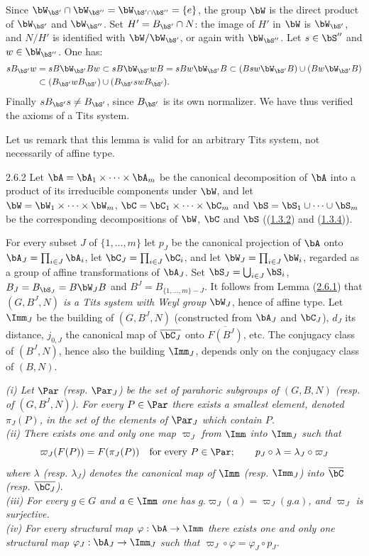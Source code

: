 \documentclass[12pt,a4paper,oneside,english]{smfart}
\makeatletter
\newcommand{\btanchor}[1]{\leavevmode\Hy@raisedlink{\hypertarget{bt:#1}{}}}
\newcommand{\btref}[1]{\hyperlink{bt:#1}{#1}}
\theoremstyle{definition}
\theoremstyle{bt}
\makeatother
\begin{document}
\medskip
Since $\bW_{\bS'}\cap\bW_{\bS''}=\bW_{\bS'\cap\bS''}=\{e\}$, the group $\bW$
is the direct product of $\bW_{\bS'}$ and $\bW_{\bS''}$. Set
$H'=B_{\bS'}\cap N$: the image of $H'$ in $\bW$ is $\bW_{\bS'}$, and $N/H'$ is
identified with $\bW/\bW_{\bS'}$, or again with $\bW_{\bS''}$. Let
$s\in\bS''$ and $w\in\bW_{\bS''}$. One has:
\begin{align*}
sB_{\bS'}w &= sB\bW_{\bS'}Bw \subset sB\bW_{\bS'}wB = sBw\bW_{\bS'}B
\subset (Bsw\bW_{\bS'}B)\cup(Bw\bW_{\bS'}B)\\
&\subset (B_{\bS'}wB_{\bS'})\cup(B_{\bS'}swB_{\bS'}).
\end{align*}
Finally $sB_{\bS'}s\neq B_{\bS'}$, since $B_{\bS'}$ is its own normalizer. We
have thus verified the axioms of a Tits system.

Let us remark that this lemma is valid for an arbitrary Tits system, not
necessarily of affine type.

\num{2.6.2}\btanchor{2.6.2}
Let $\bA=\bA_1\times\dots\times\bA_m$ be the canonical decomposition of $\bA$
into a product of its irreducible components under $\bW$, and let
$\bW=\bW_1\times\dots\times\bW_m$, $\bC=\bC_1\times\dots\times\bC_m$ and
$\bS=\bS_1\cup\dots\cup\bS_m$ be the corresponding decompositions of $\bW$,
$\bC$ and $\bS$ ((\btref{1.3.2}) and (\btref{1.3.4})).

For every subset $J$ of $\{1,\dots,m\}$ let $p_J$ be the canonical projection
of $\bA$ onto $\bA_J=\prod_{i\in J}\bA_i$, let $\bC_J=\prod_{i\in J}\bC_i$,
and let $\bW_J=\prod_{i\in J}\bW_i$, regarded as a group of affine
transformations of $\bA_J$. Set $\bS_J=\bigcup_{i\in J}\bS_i$,
$B_J=B_{\bS_J}=B\bW_JB$ and $B^J=B_{\{1,\dots,m\}-J}$. It follows from Lemma
(\btref{2.6.1}) that \emph{$(G,B^J,N)$ is a Tits system with Weyl group $\bW_J$},
hence of affine type. Let $\Imm_J$ be the building of $(G,B^J,N)$ (constructed
from $\bA_J$ and $\bC_J$), $d_J$ its distance, $j_{0,J}$ the canonical map of
$\overline{\bC_J}$ onto $\overline{F(B^J)}$, etc. The conjugacy class of
$(B^J,N)$, hence also the building $\Imm_J$, depends only on the conjugacy
class of $(B,N)$.

\btanchor{2.6.3}
\emph{(i) Let $\Par$ (resp. $\Par_J$) be the set of parahoric subgroups of
$(G,B,N)$ (resp. of $(G,B^J,N)$). For every $P\in\Par$ there exists a smallest
element, denoted $\pi_J(P)$, in the set of the elements of $\Par_J$ which
contain $P$.\\
(ii) There exists one and only one map $\varpi_J$ from $\Imm$ into $\Imm_J$
such that
\[
\varpi_J(F(P))=F(\pi_J(P))\quad\text{for every }P\in\Par;\qquad
p_J\circ\lambda=\lambda_J\circ\varpi_J
\]
where $\lambda$ (resp. $\lambda_J$) denotes the canonical map of $\Imm$
(resp. $\Imm_J$) into $\overline{\bC}$ (resp. $\overline{\bC_J}$).\\
(iii) For every $g\in G$ and $a\in\Imm$ one has
$g.\varpi_J(a)=\varpi_J(g.a)$, and $\varpi_J$ is surjective.\\
(iv) For every structural map $\varphi:\bA\to\Imm$ there exists one and only
one structural map $\varphi_J:\bA_J\to\Imm_J$ such that
$\varpi_J\circ\varphi=\varphi_J\circ p_J$.}
\end{document}
